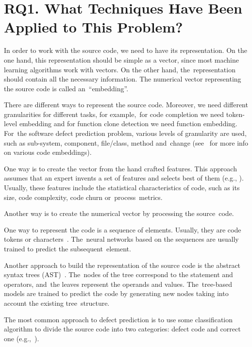 \documentclass[mathematics,review,accept,moreauthors,pdftex]{Definitions/mdpi}
\begin{document}
\section{RQ1. What Techniques Have Been Applied to This Problem?}\label{sec_3}

In order to work with the source code, we need to have its representation.
On the one hand, this representation should be simple as a vector, since most machine learning algorithms work with vectors.
On the other hand, the~representation should contain all the necessary information. 
The numerical vector representing the source code is called an~``embedding''.

There are different ways to represent the source code. Moreover, we need different granularities for different tasks, for example,~for code completion we need token-level embedding and for function clone detection we need function embedding. For~the software defect prediction problem, various levels of granularity are used, such as sub-system, component, file/class, method and~change (see~\cite{AllamanisEtAl2018,ChenMonperrus2019} for more info on various code embeddings).

One way is to create the vector from the hand crafted features.
This approach assumes that an expert invents a set of features and selects best of them (e.g., \cite{SharminEtAl2015,DamEtAl2018}).
Usually, these features include the statistical characteristics of code, such as its size, code complexity, code churn or~process~metrics.

Another way is to create the numerical vector by processing the source~code.

One way to represent the code is a sequence of elements. Usually, they are code tokens or characters~\cite{MikolovEtAl2013}. The~neural networks based on the sequences are usually trained to predict the subsequent~element.

Another approach to build the representation of the source code is the abstract syntax trees (AST)~\cite{ZhangEtAl2019}. The~nodes of the tree correspond to the statement and operators, and~the leaves represent the operands and values. The~tree-based models are trained to predict the code by generating new nodes taking into account the existing tree~structure. 

The most common approach to defect prediction is to use some classification algorithm to divide the source code into two categories: defect code and correct one (e.g.,~\cite{PradelSen2018}).
\end{document}
